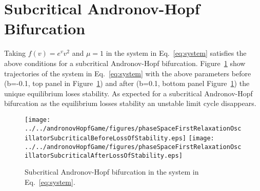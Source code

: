 \documentclass{article}
\begin{document}
\section{Subcritical Andronov-Hopf Bifurcation}

Taking $f(v)=e^vv^2$ and $\mu=1$ in the system in Eq.~\ref{eq:system}
satisfies the above conditions for a subcritical Andronov-Hopf bifurcation.
Figure~\ref{fig:subcriticalAH} show trajectories of the system  in
Eq.~\ref{eq:system} with the above parameters before (b=-0.1, top panel in
Figure~\ref{fig:subcriticalAH}) and after (b=0.1, bottom panel
Figure~\ref{fig:subcriticalAH}) the unique equilibrium loses stability. As
expected for a subcritical Andronov-Hopf bifurcation as the equilibrium losses
stability an unstable limit cycle disappears.

\begin{center}
\begin{figure}
\texttt{[image: ../../andronovHopfGame/figures/phaseSpaceFirstRelaxationOscillatorSubcriticalBeforeLossOfStability.eps]}
\texttt{[image: ../../andronovHopfGame/figures/phaseSpaceFirstRelaxationOscillatorSubcriticalAfterLossOfStability.eps]}
\caption{Subcritical Andronov-Hopf bifurcation in the system in
Eq.~\ref{eq:system}.}
\label{fig:subcriticalAH}
\end{figure}
\end{center}



\end{document}
